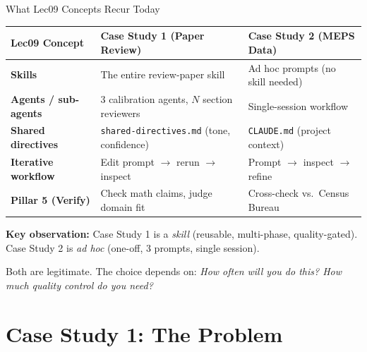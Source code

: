 \documentclass[10pt,english,aspectratio=169]{beamer}
\begin{document}
\begin{frame}{What Lec09 Concepts Recur Today}

\begin{small}
\begin{tabular}{p{3.5cm}p{5.0cm}p{4.5cm}}
\toprule
\textbf{Lec09 Concept} & \textbf{Case Study 1 (Paper Review)} & \textbf{Case Study 2 (MEPS Data)} \\
\midrule
\textbf{Skills} & The entire review-paper skill & Ad hoc prompts (no skill needed) \\
\textbf{Agents / sub-agents} & 3 calibration agents, $N$ section reviewers & Single-session workflow \\
\textbf{Shared directives} & \texttt{shared-directives.md} (tone, confidence) & \texttt{CLAUDE.md} (project context) \\
\textbf{Iterative workflow} & Edit prompt $\to$ rerun $\to$ inspect & Prompt $\to$ inspect $\to$ refine \\
\textbf{Pillar 5 (Verify)} & Check math claims, judge domain fit & Cross-check vs.\ Census Bureau \\
\bottomrule
\end{tabular}
\end{small}

\vspace{0.4cm}
\textbf{Key observation:} Case Study 1 is a \emph{skill} (reusable, multi-phase, quality-gated).\\
Case Study 2 is \emph{ad hoc} (one-off, 3 prompts, single session).

\vspace{0.2cm}
Both are legitimate. The choice depends on: \emph{How often will you do this? How much quality control do you need?}

\end{frame}


\section{Case Study 1: The Problem}
\end{document}

